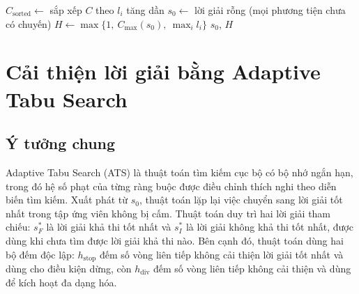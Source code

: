 \documentclass[../DoAn.tex]{subfiles}
\begin{document}
\begin{algorithm}[H]
\caption{Greedy Insertion -- Xây dựng lời giải ban đầu}
\label{alg:greedy}
$C_{\text{sorted}} \leftarrow$ sắp xếp $C$ theo $l_i$ tăng dần\;
$s_0 \leftarrow$ lời giải rỗng (mọi phương tiện chưa có chuyến)\;
$H \leftarrow \max\{1,\ C_{\max}(s_0),\ \max_i l_i\}$\;
\Return $s_0$, $H$\;
\end{algorithm}

\section{Cải thiện lời giải bằng Adaptive Tabu Search}
\label{sec:ats}

\subsection{Ý tưởng chung}

Adaptive Tabu Search (ATS) là thuật toán tìm kiếm cục bộ có bộ nhớ ngắn hạn, trong đó hệ số phạt của từng ràng buộc được điều chỉnh thích nghi theo diễn biến tìm kiếm. Xuất phát từ $s_0$, thuật toán lặp lại việc chuyển sang lời giải tốt nhất trong tập ứng viên không bị cấm. Thuật toán duy trì hai lời giải tham chiếu: $s^*_F$ là lời giải khả thi tốt nhất và $s^*_I$ là lời giải không khả thi tốt nhất, được dùng khi chưa tìm được lời giải khả thi nào. Bên cạnh đó, thuật toán dùng hai bộ đếm độc lập: $h_{\text{stop}}$ đếm số vòng liên tiếp không cải thiện lời giải tốt nhất và dùng cho điều kiện dừng, còn $h_{\text{div}}$ đếm số vòng liên tiếp không cải thiện và dùng để kích hoạt đa dạng hóa.
\end{document}
